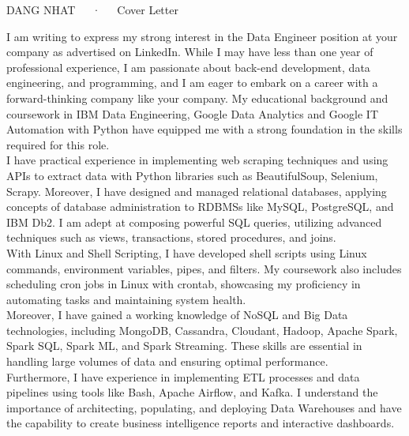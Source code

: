 \documentclass[11pt, a4paper]{awesome-cv}
\begin{document}
\makecvheader[R]

\makecvfooter
  {DANG NHAT~~~·~~~Cover Letter}
  {}

\makelettertitle

\begin{cvletter}
I am writing to express my strong interest in the Data Engineer position at your company as advertised on LinkedIn. While I may have less than one year of professional experience, I am passionate about back-end development, data engineering, and programming, and I am eager to embark on a career with a forward-thinking company like your company. My educational background and coursework in IBM Data Engineering, Google Data Analytics and Google IT Automation with Python have equipped me with a strong foundation in the skills required for this role.
\\I have practical experience in implementing web scraping techniques and using APIs to extract data with Python libraries such as BeautifulSoup, Selenium, Scrapy. Moreover, I have designed and managed relational databases, applying concepts of database administration to RDBMSs like MySQL, PostgreSQL, and IBM Db2. I am adept at composing powerful SQL queries, utilizing advanced techniques such as views, transactions, stored procedures, and joins.
\\With Linux and Shell Scripting, I have developed shell scripts using Linux commands, environment variables, pipes, and filters. My coursework also includes scheduling cron jobs in Linux with crontab, showcasing my proficiency in automating tasks and maintaining system health.
\\Moreover, I have gained a working knowledge of NoSQL and Big Data technologies, including MongoDB, Cassandra, Cloudant, Hadoop, Apache Spark, Spark SQL, Spark ML, and Spark Streaming. These skills are essential in handling large volumes of data and ensuring optimal performance.
\\Furthermore, I have experience in implementing ETL processes and data pipelines using tools like Bash, Apache Airflow, and Kafka. I understand the importance of architecting, populating, and deploying Data Warehouses and have the capability to create business intelligence reports and interactive dashboards.

\end{cvletter}
\end{document}
